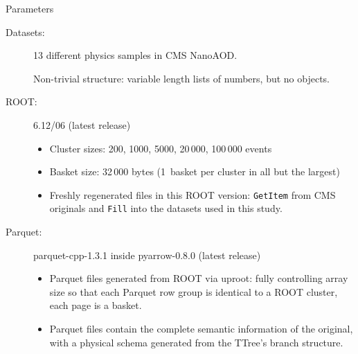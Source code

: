 \documentclass[aspectratio=169]{beamer}
\begin{document}
\begin{frame}{Parameters}
\vspace{0.35 cm}
\begin{description}
\item[Datasets:] 13 different physics samples in CMS NanoAOD.

\vspace{0.2 cm}
Non-trivial structure: variable length lists of numbers, but no objects.

\item[ROOT:] 6.12/06 (latest release)

\begin{itemize}
\item Cluster sizes: 200, 1000, 5000, 20\,000, 100\,000 events
\item Basket size: 32\,000 bytes (1~basket per cluster in all but the largest)
\item Freshly regenerated files in this ROOT version: {\tt\small GetItem} from CMS originals and {\tt\small Fill} into the datasets used in this study.
\end{itemize}

\item[Parquet:] parquet-cpp-1.3.1 inside pyarrow-0.8.0 (latest release)

\begin{itemize}
\item Parquet files generated from ROOT via uproot: fully controlling array size so that each Parquet row group is identical to a ROOT cluster, each page is a basket.
\item Parquet files contain the complete semantic information of the original, with a physical schema generated from the TTree's branch structure.
\end{itemize}
\end{description}
\end{frame}
\end{document}

